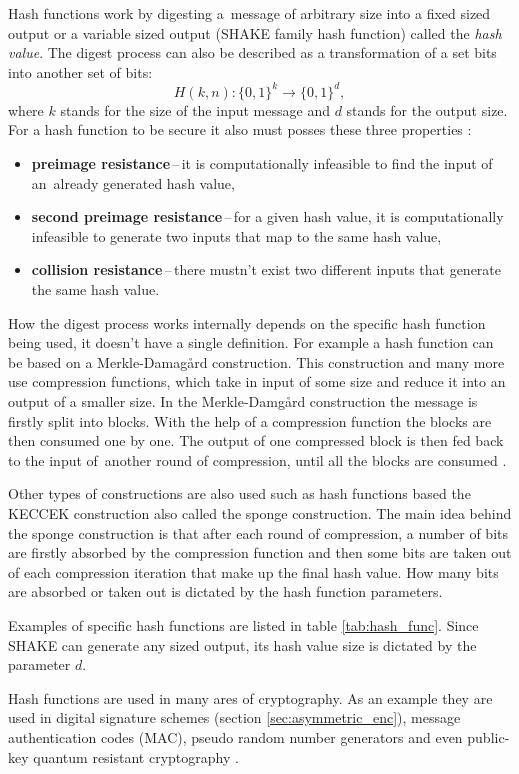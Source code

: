 Hash functions work by digesting a~message of arbitrary size into a fixed sized output or a variable sized output (SHAKE family hash function) called the \textit{hash value}. The digest process can also be described as a transformation of a set bits into another set of bits:
\begin{equation}
  H(k, n): \{0,1\}^k \rightarrow \{0,1\}^d,
\end{equation}
where $k$ stands for the size of the input message and $d$ stands for the output size.
\newpage
\noindent For a hash function to be secure it also must posses these three properties \cite{Paar2010}:
\begin{itemize}
  \item \textbf{preimage resistance}\,--\,it is computationally infeasible to find the input of an~already generated hash value,
  \item \textbf{second preimage resistance}\,--\,for a given hash value, it is computationally infeasible to generate two inputs that map to the same hash value,
  \item \textbf{collision resistance}\,--\,there mustn't exist two different inputs that generate the same hash value.
\end{itemize}

How the digest process works internally depends on the specific hash function being used, it doesn't have a single definition. For example a hash function can be based on a Merkle-Damag\aa rd construction. This construction and many more use compression functions, which take in input of some size and reduce it into an output of a smaller size. In the Merkle-Damg\aa rd construction the message is firstly split into blocks. With the help of a compression function the blocks are then consumed one by one. The output of one compressed block is then fed back to the input of~another round of compression, until all the blocks are consumed \cite{Smart2004}.

Other types of constructions are also used such as hash functions based the KECCEK construction also called the sponge construction. The main idea behind the sponge construction is that after each round of compression, a number of bits are firstly absorbed by the compression function and then some bits are taken out of each compression iteration that make up the final hash value. How many bits are absorbed or taken out is dictated by the hash function parameters. \cite{1Od8f4TuMxetfmHu}

Examples of specific hash functions are listed in table \ref{tab:hash_func}. Since SHAKE can generate any sized output, its hash value size is dictated by the parameter $d$.


Hash functions are used in many ares of cryptography. As an example they are used in digital signature schemes (section \ref{sec:asymmetric_enc}), message authentication codes (\acs{MAC}), pseudo random number generators and even public-key quantum resistant cryptography \cite{Chen2016}.
